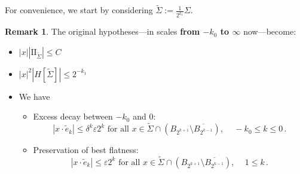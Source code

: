 \documentclass{article}
\newcommand{\ep}{\varepsilon}
\theoremstyle{definition}
\newtheorem{remark}[theorem]{Remark}
\begin{document}
For convenience, we start by considering $\widetilde \Sigma:=\frac{1}{2^{k_1}}\Sigma$.
\begin{remark}\label{rmk:89ttqovba}
    The original hypotheses---in scales \textbf{from $-k_0$ to $\infty$} now---become:
    \begin{itemize}
    \item $|x||\mathrm{II}_{\widetilde \Sigma}|\leq C$
    \item $|x|^2|H[\widetilde \Sigma]|\leq 2^{-k_1}$
    
    \item We have
    \begin{itemize}
    \item Excess decay between $-k_0$ and $0$:
    \begin{equation}\label{eq:s1r138tqhq}
        |x\cdot \widetilde e_{k}|\leq \delta^{k}\ep 2^{k} \mbox{ for all } x\in\widetilde \Sigma\cap(B_{2^{k+1}}\setminus \overline{B_{2^{k-1}}}),\,\quad -k_0\leq k \leq 0\,.
    \end{equation}
    \item Preservation of best flatness:
    \begin{equation}\label{eq:s1r138tqhq2}
        |x\cdot \widetilde e_{k}|\leq \ep 2^{k} \mbox{ for all } x\in\widetilde \Sigma\cap(B_{2^{k+1}}\setminus \overline{B_{2^{k-1}}}),\,\quad 1\leq k \,.
    \end{equation}
\end{itemize}
\end{itemize}
\end{remark}
\end{document}
